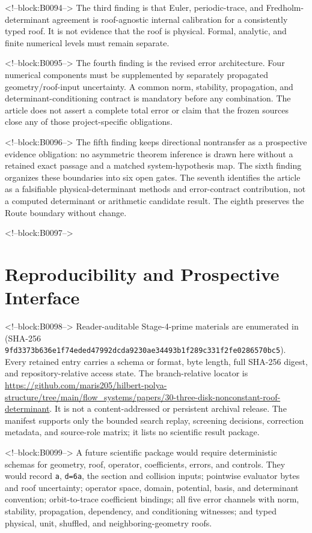 \documentclass[11pt,a4paper]{article}
\begin{document}
<!--block:B0094-->
The third finding is that Euler, periodic-trace, and Fredholm-determinant agreement is roof-agnostic internal calibration for a consistently typed roof. It is not evidence that the roof is physical. Formal, analytic, and finite numerical levels must remain separate.

<!--block:B0095-->
The fourth finding is the revised error architecture. Four numerical components must be supplemented by separately propagated geometry/roof-input uncertainty. A common norm, stability, propagation, and determinant-conditioning contract is mandatory before any combination. The article does not assert a complete total error or claim that the frozen sources close any of those project-specific obligations.

<!--block:B0096-->
The fifth finding keeps directional nontransfer as a prospective evidence obligation: no asymmetric theorem inference is drawn here without a retained exact passage and a matched system-hypothesis map. The sixth finding organizes these boundaries into six open gates. The seventh identifies the article as a falsifiable physical-determinant methods and error-contract contribution, not a computed determinant or arithmetic candidate result. The eighth preserves the Route boundary without change.

<!--block:B0097-->
\section{Reproducibility and Prospective Interface}

<!--block:B0098-->
Reader-auditable Stage-4-prime materials are enumerated in
 (SHA-256
\texttt{9fd3373b636e1f74\allowbreak eded47992dcda923\allowbreak 0ae34493b1f289c3\allowbreak 31f2fe0286570bc5}).  Every retained entry carries a schema or format,
byte length, full SHA-256 digest, and repository-relative access state.  The
branch-relative locator is
\url{https://github.com/maris205/hilbert-polya-structure/tree/main/flow_systems/papers/30-three-disk-nonconstant-roof-determinant}.
It is not a content-addressed or persistent archival release.  The manifest
supports only the bounded search replay, screening decisions, correction
metadata, and source-role matrix; it lists no scientific result package.

<!--block:B0099-->
A future scientific package would require deterministic schemas for geometry, roof, operator, coefficients, errors, and controls. They would record \texttt{a}, \texttt{d=6a}, the section and collision inputs; pointwise evaluator bytes and roof uncertainty; operator space, domain, potential, basis, and determinant convention; orbit-to-trace coefficient bindings; all five error channels with norm, stability, propagation, dependency, and conditioning witnesses; and typed physical, unit, shuffled, and neighboring-geometry roofs.
\end{document}
